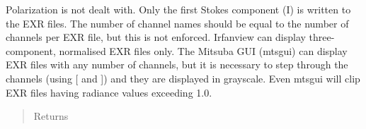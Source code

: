 \documentclass[a4paper,10pt,english]{sphinxmanual}
\begin{document}
\begin{fulllineitems}
\begin{fulllineitems}
\begin{quote}
\begin{description}
\begin{itemize}
\end{itemize}

\end{description}\end{quote}

Polarization is not dealt with. Only the first Stokes component (I) is written to the EXR files.
The number of channel names should be equal to the number of channels per EXR file, but this is not
enforced.
Irfanview can display three-component, normalised EXR files only. The Mitsuba GUI (mtsgui) can display
EXR files with any number of channels, but it is necessary to step through the channels (using {[} and {]})
and they are displayed in grayscale. Even mtsgui will clip EXR files having radiance values exceeding 1.0.
\begin{quote}\begin{description}
\item[{Returns}] \leavevmode


\end{description}\end{quote}

\end{fulllineitems}


\end{fulllineitems}

\end{document}
